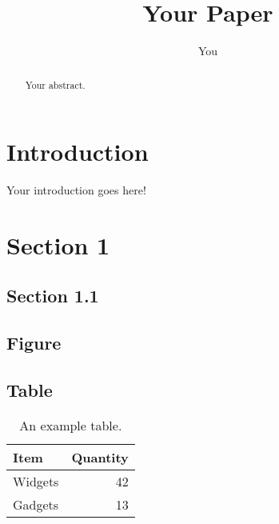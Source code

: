 \documentclass{article}
\title{Your Paper}
\author{You}
\begin{document}
\maketitle

\begin{abstract}
Your abstract.
\end{abstract}

\section{Introduction}

Your introduction goes here! 

\section{Section 1}

\subsection{Section 1.1}

\subsection{Figure}


\subsection{Table}

\begin{table}
\centering
\begin{tabular}{l|r}
Item & Quantity \\\hline
Widgets & 42 \\
Gadgets & 13
\end{tabular}
\caption{\label{tab:widgets}An example table.}
\end{table}



\end{document}

